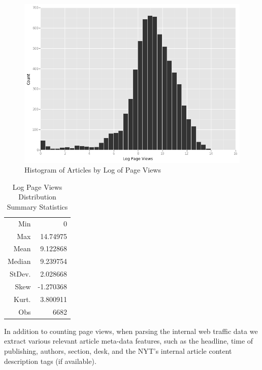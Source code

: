 \documentclass[fleqn,12pt]{SelfArx} %
\begin{document}
\begin{figure}[ht]\centering
\includegraphics[width=\linewidth]{log_pageviews_hist}
\caption{Histogram of Articles by Log of Page Views}
\label{fig:lpv_hist}
\end{figure}

\begin{table}[hbt]
\caption{Log Page Views Distribution Summary Statistics}
\centering
\begin{tabular}{rr}
\toprule
Min               &  0\\
Max               &  14.74975\\  
Mean              &  9.122868\\
Median            &  9.239754\\
StDev.            &  2.028668\\
Skew              &  -1.270368\\
Kurt.             &  3.800911\\
\midrule
Obs &  6682\\
\bottomrule
\end{tabular}
\end{table}


In addition to counting page views, when parsing the internal web traffic data we extract various relevant article meta-data features, such as the headline, time of publishing, authors, section, desk, and the NYT's internal article content description tags (if available).
\end{document}

